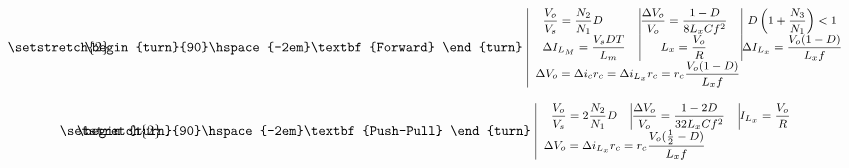 \documentclass[twocolumn]{article}
\begin{document}
\vspace*{0.5em}
\begin{equation}
{\setstretch{2}
\hspace{-0.79cm}
\begin{array}{r|c}
{\begin{turn}{90}\hspace{-2em}\textbf{Forward} \end{turn}} \hspace{-0.05cm} & \hspace{-0.15cm}
{\begin{array}{l}
\begin{array}{c  c  c}
\textrm{\footnotesize $\displaystyle  \frac{V_o}{V_s} = \frac{N_2}{N_1}D$}\hfill &\vline \hfill \textrm{\footnotesize $\displaystyle  \frac{\Delta V_o}{V_o} = \frac{1-D}{8L_xCf^2} $} \hfill&\vline\hfill \textrm{\footnotesize $ \displaystyle    D \left( 1+\frac{N_3}{N_1} \right) <1 $}\nonumber \hfill \\
\textrm{\footnotesize $\displaystyle \Delta I_{L_M} = \frac{V_sDT }{L_m}$}\hfill &\vline \hfill\textrm{\footnotesize $\displaystyle  L_x = \frac{V_o}{R}$}\hfill &\vline\hfill \textrm{\footnotesize $ \displaystyle  \Delta I_{L_x} =\frac{V_o(1-D)}{L_xf}$} \hfill\nonumber\\
\end{array}\\
\textrm{\footnotesize $\displaystyle \Delta V_o = \Delta i_c r_c = \Delta i_{L_x} r_c = r_c\frac{V_o(1-D)}{L_xf}$}\\
\end{array}}
\end{array}}
\end{equation}


\vspace*{0.5em}
\begin{equation}
{\setstretch{2}
\hspace{-2.3cm}
\begin{array}{r|c}
{\begin{turn}{90}\hspace{-2em}\textbf{Push-Pull} \end{turn}} \hspace{-0.05cm} & \hspace{-0.15cm}
{\begin{array}{l}
\begin{array}{c  c  c}
\textrm{\footnotesize $\displaystyle  \frac{V_o}{V_s} = 2\frac{N_2}{N_1}D$}\hfill &\vline \hfill \textrm{\footnotesize $\displaystyle  \frac{\Delta V_o}{V_o} = \frac{1-2D}{32L_xCf^2} $} \hfill&\vline\hfill \textrm{\footnotesize $ \displaystyle    I_{L_x} = \frac{V_o}{R} $}\nonumber \hfill \\
\end{array}\\
\textrm{\footnotesize $\displaystyle \Delta V_o = \Delta i_{L_x} r_c = r_c\frac{V_o(\frac{1}{2}-D)}{L_xf}$}\\
\end{array}}
\end{array}}
\end{equation}
\end{document}
